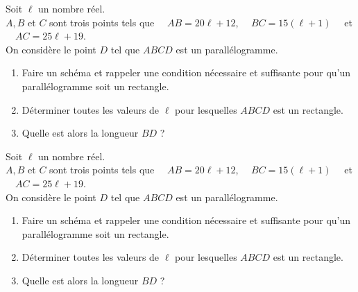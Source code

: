 \documentclass[a4paper,11pt,exos]{nsi} %
\begin{document}
\maketitle





Soit $\ell$ un nombre réel.\\
$A, B$ et $C$ sont trois points tels que $\quad AB=20\ell +12$, $\quad BC=15(\ell+1)\quad$ et $\quad AC=25\ell +19$.\\
On considère le point $D$ tel que $ABCD$ est un parallélogramme.
\begin{enumerate}
	\item 	Faire un schéma et rappeler une condition nécessaire et suffisante pour qu'un parallélogramme soit un rectangle.
	\item 	Déterminer toutes les valeurs de $\ell$ pour lesquelles $ABCD$ est un rectangle.
	\item	 Quelle est alors la longueur $BD$ ?\\
\end{enumerate}


\vspace*{1cm}


\maketitle

Soit $\ell$ un nombre réel.\\
$A, B$ et $C$ sont trois points tels que $\quad AB=20\ell +12$, $\quad BC=15(\ell+1)\quad$ et $\quad AC=25\ell +19$.\\
On considère le point $D$ tel que $ABCD$ est un parallélogramme.
\begin{enumerate}
	\item 	Faire un schéma et rappeler une condition nécessaire et suffisante pour qu'un parallélogramme soit un rectangle.
	\item 	Déterminer toutes les valeurs de $\ell$ pour lesquelles $ABCD$ est un rectangle.
	\item	 Quelle est alors la longueur $BD$ ?\\
\end{enumerate}

\vspace*{1cm}

\maketitle
\end{document}
